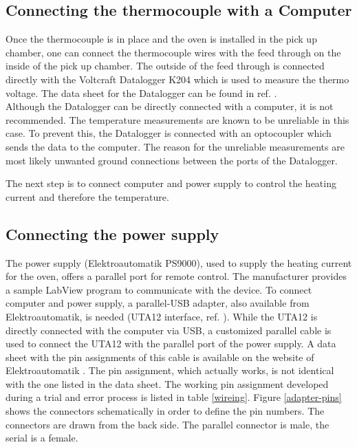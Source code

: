 \documentclass[parskip,12pt,headsepline,a4paper] {scrbook}
\begin{document}
\subsection{Connecting the thermocouple with a Computer}
\vspace{-1\baselineskip}
Once the thermocouple is in place and the oven is installed in the pick up chamber, one can connect the thermocouple wires with the feed through on the inside of the pick up chamber. The outside of the feed through is connected directly with the Voltcraft Datalogger K204 which is used to measure the thermo voltage. The data sheet for the Datalogger can be found in ref. \cite{ref-datalogger}. \\
Although the Datalogger can be directly connected with a computer, it is not recommended. The temperature measurements are known to be unreliable in this case. To prevent this, the Datalogger is connected with an optocoupler which sends the data to the computer. The reason for the unreliable measurements are most likely unwanted ground connections between the ports of the Datalogger.

The next step is to connect computer and power supply to control the heating current and therefore the temperature.

\subsection{Connecting the power supply}
\vspace{-1\baselineskip}
The power supply (Elektroautomatik PS9000), used to supply the heating current for the oven, offers a parallel port for remote control. The manufacturer provides a sample LabView program to communicate with the device. To connect computer and power supply, a parallel-USB adapter, also available from Elektroautomatik, is needed (UTA12 interface, ref. \cite{ref-uta12}). While the UTA12 is directly connected with the computer via USB, a customized parallel cable is used to connect the UTA12 with the parallel port of the power supply. A data sheet with the pin assignments of this cable is available on the website of Elektroautomatik \cite{ref-uta12}. The pin assignment, which actually works, is not identical with the one listed in the data sheet. The working pin assignment developed during a trial and error process is listed in table \ref{wireing}. Figure \ref{adapter-pins} shows the connectors schematically in order to define the pin numbers. The connectors are drawn from the back side. The parallel connector is male, the serial is a female.
\end{document}
